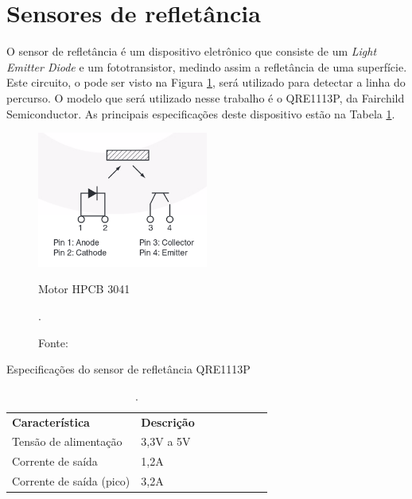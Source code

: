 \vspace{0.5cm}
\section{Sensores de refletância} \label{cap:reflet}
O sensor de refletância é um dispositivo eletrônico que consiste de um \textit{Light Emitter Diode} 
 e um fototransistor, medindo assim a refletância de uma superfície. Este circuito, o 
pode ser visto na Figura \ref{fig:refletse}, 
será utilizado para detectar a linha do percurso. 
O modelo que será utilizado nesse trabalho é o QRE1113P, da Fairchild %
Semiconductor. 
As principais especificações deste dispositivo estão na Tabela \ref{tab:ref}.


\begin{figure}[h!]
 \centering
 \captionsetup{width=0.52\textwidth,font=footnotesize,textfont=bf}
 \includegraphics[width=0.5\textwidth,height=0.5\textheight,keepaspectratio]{figuras/qre.png}
 \caption{Motor HPCB 3041 \label{fig:refletse}}
 \vspace{-0.3cm}
 \caption*{Fonte: \cite{reflet}}.
\end{figure}


\begin{table}[h!]
\centering
 \captionsetup{width=0.47\textwidth,font=footnotesize,textfont=bf}
\caption{Especificações do sensor de refletância QRE1113P \label{tab:ref}}
\begin{tabular}{llllllll}
\cline{1-2}
\bf Característica & \bf Descrição & & &  \\ \cline{1-2}
Tensão de alimentação & 3,3V a 5V & & &  \\
Corrente de saída & 1,2A  & & &  \\
Corrente de saída (pico) & 3,2A & & &  \\ \cline{1-2}
\end{tabular}
\caption*{\cite{reflet}. }
\end{table}




